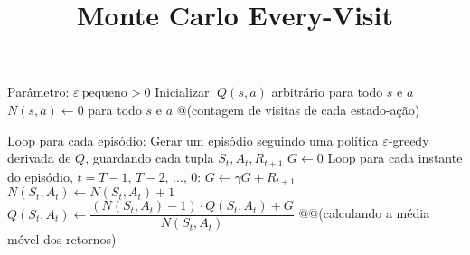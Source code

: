 \documentclass[brazilian,preview]{standalone}
\title{Monte Carlo Every-Visit}
\begin{document}
\begin{algorithm}
Parâmetro: $\varepsilon\ \mathrm{pequeno} > 0$
Inicializar:
    $Q(s, a)$ arbitrário para todo $s$ e $a$
    $N(s, a) \leftarrow 0$ para todo $s$ e $a$ @\hfill@ (contagem de visitas de cada estado-ação)

Loop para cada episódio:
    Gerar um episódio seguindo uma política $\varepsilon$-greedy derivada de $Q$, guardando cada tupla $S_t, A_t, R_{t+1}$
    $G \leftarrow 0$
    Loop para cada instante do episódio, $t = T-1,\, T-2,\, \dots,\, 0$:
        $G \leftarrow γG + R_{t+1}$
        $N(S_t, A_t) \leftarrow N(S_t, A_t) + 1$
        $Q(S_t, A_t) \leftarrow \dfrac{(N(S_t, A_t) - 1) \cdot Q(S_t, A_t) + G}{N(S_t, A_t)}$ @\hfill @(calculando a média móvel dos retornos)
\end{algorithm}
\end{document}
